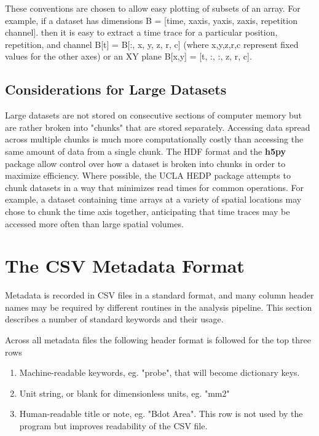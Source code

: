 \documentclass[12pt]{article}
\newcommand{\loc}[1]{{\bf \fontfamily{pcr}\selectfont #1}}
\begin{document}
These conventions are chosen to allow easy plotting of subsets of an array. For example, if a dataset has dimensions B = [time, xaxis, yaxis, zaxis, repetition channel]. then it is easy to extract a time trace for a particular position, repetition, and channel B[t] = B[:, x, y, z, r, c] (where x,y,z,r,c represent fixed values for the other axes) or an XY plane B[x,y] = [t, :, :, z, r, c]. 

\subsection{Considerations for Large Datasets}

Large datasets are not stored on consecutive sections of computer memory but are rather broken into "chunks" that are stored separately. Accessing data spread across multiple chunks is much more computationally costly than accessing the same amount of data from a single chunk. The HDF format and the \loc{h5py} package allow control over how a dataset is broken into chunks in order to maximize efficiency. Where possible, the UCLA HEDP package attempts to chunk datasets in a way that minimizes read times for common operations. For example, a dataset containing time arrays at a variety of spatial locations may chose to chunk the time axis together, anticipating that time traces may be accessed more often than large spatial volumes.


\section{The CSV Metadata Format\label{csv_format}}

Metadata is recorded in CSV files in a standard format, and many column header names may be required by different routines in the analysis pipeline. This section describes a number of standard keywords and their usage. 

Across all metadata files the following header format is followed for the top three rows
\begin{enumerate}
\item Machine-readable keywords, eg. "probe", that will become dictionary keys.
\item Unit string, or blank for dimensionless units, eg. "mm2"
\item Human-readable title or note, eg. "Bdot Area". This row is not used by the program but improves readability of the CSV file.
\end{enumerate}
\end{document}
